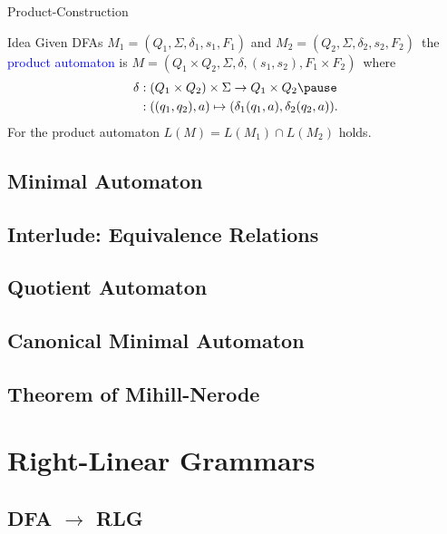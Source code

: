 \documentclass{beamer}
\def\padding{\vspace{0.5cm}}
\def\b{\textcolor{blue}}
\begin{document}
\begin{frame}{Product-Construction}
    \begin{block}{Idea}
        Given DFAs $M_1 = (Q_1, \Sigma, \delta_1, s_1, F_1)$ and $M_2 = (Q_2, \Sigma, \delta_2, s_2, F_2)$\pause\ the \b{product automaton} is $M = (Q_1 \times Q_2, \Sigma, \delta, (s_1, s_2), F_1 \times F_2)$\pause\ where
        \begin{align*}
            \delta &: (Q_1 \times Q_2) \times \Sigma \to Q_1 \times Q_2 \pause\\
                   &: ((q_1, q_2), a) \mapsto (\delta_1(q_1, a), \delta_2(q_2, a)).
        \end{align*}\pause\padding
        For the product automaton $L(M) = L(M_1) \cap L(M_2)$ holds.
    \end{block}
\end{frame}

\subsection{Minimal Automaton}

\subsection{Interlude: Equivalence Relations}

\subsection{Quotient Automaton}

\subsection{Canonical Minimal Automaton}

\subsection{Theorem of Mihill-Nerode}

\section{Right-Linear Grammars}

\subsection{DFA $\to$ RLG}
\end{document}
